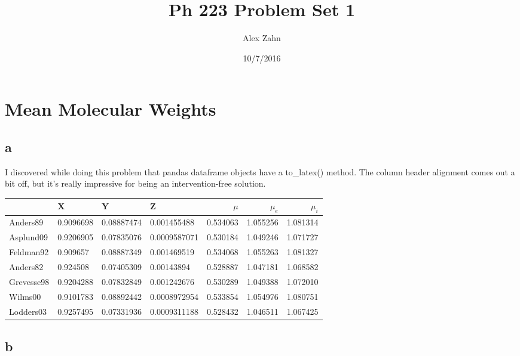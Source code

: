 \documentclass[12pt]{article}
\title{Ph 223 Problem Set 1}
\author{Alex Zahn}
\date{10/7/2016}
\begin{document}
\maketitle

\newcommand{\wmsq}{W/\(\mathrm{m}^2\,\)}
\newcommand{\msq}{\(\mathrm{m}^2\,\)}
\newcommand{\micron}{\(\mu\mathrm{m}\)\,}
\newcommand{\mcb}{\(\mathrm{m}^3\,\)}

\section{Mean Molecular Weights}

\subsection*{a}

I discovered while doing this problem that pandas dataframe objects have a to\_latex() method. The column header alignment comes out a bit off, but it's really impressive for being an intervention-free solution.

\begin{center}
\begin{tabular}{llllrrr}
\toprule
{} &          X &           Y &             Z &   \(\mu\) &  \(\mu_e\) &  \(\mu_i\) \\
\midrule
Anders89   &  0.9096698 &  0.08887474 &   0.001455488 &  0.534063 &   1.055256 &   1.081314 \\
Asplund09  &  0.9206905 &  0.07835076 &  0.0009587071 &  0.530184 &   1.049246 &   1.071727 \\
Feldman92  &   0.909657 &  0.08887349 &   0.001469519 &  0.534068 &   1.055263 &   1.081327 \\
Anders82   &   0.924508 &  0.07405309 &    0.00143894 &  0.528887 &   1.047181 &   1.068582 \\
Grevesse98 &  0.9204288 &  0.07832849 &   0.001242676 &  0.530289 &   1.049388 &   1.072010 \\
Wilms00    &  0.9101783 &  0.08892442 &  0.0008972954 &  0.533854 &   1.054976 &   1.080751 \\
Lodders03  &  0.9257495 &  0.07331936 &  0.0009311188 &  0.528432 &   1.046511 &   1.067425 \\
\bottomrule
\end{tabular}
\end{center}

\subsection*{b}
\end{document}
